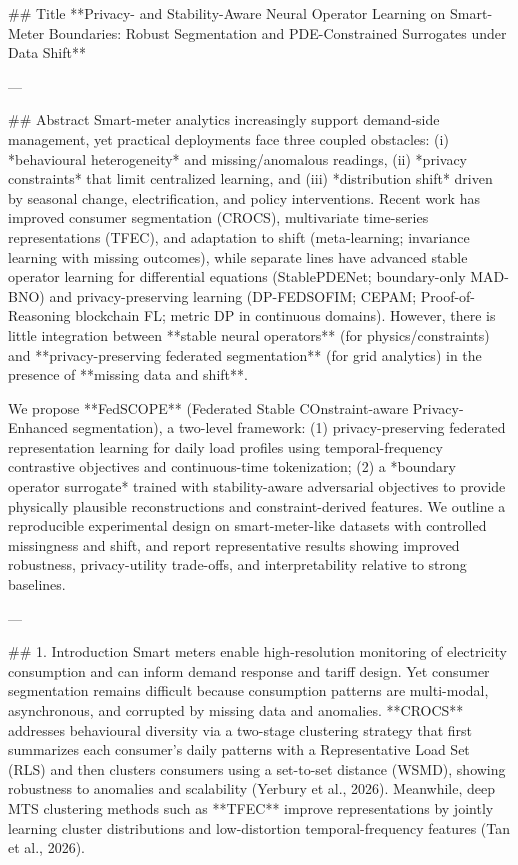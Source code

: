 ## Title  
**Privacy- and Stability-Aware Neural Operator Learning on Smart-Meter Boundaries: Robust Segmentation and PDE-Constrained Surrogates under Data Shift**

---

## Abstract  
Smart-meter analytics increasingly support demand-side management, yet practical deployments face three coupled obstacles: (i) *behavioural heterogeneity* and missing/anomalous readings, (ii) *privacy constraints* that limit centralized learning, and (iii) *distribution shift* driven by seasonal change, electrification, and policy interventions. Recent work has improved consumer segmentation (CROCS), multivariate time-series representations (TFEC), and adaptation to shift (meta-learning; invariance learning with missing outcomes), while separate lines have advanced stable operator learning for differential equations (StablePDENet; boundary-only MAD-BNO) and privacy-preserving learning (DP-FEDSOFIM; CEPAM; Proof-of-Reasoning blockchain FL; metric DP in continuous domains). However, there is little integration between **stable neural operators** (for physics/constraints) and **privacy-preserving federated segmentation** (for grid analytics) in the presence of **missing data and shift**.  

We propose **FedSCOPE** (Federated Stable COnstraint-aware Privacy-Enhanced segmentation), a two-level framework: (1) privacy-preserving federated representation learning for daily load profiles using temporal-frequency contrastive objectives and continuous-time tokenization; (2) a *boundary operator surrogate* trained with stability-aware adversarial objectives to provide physically plausible reconstructions and constraint-derived features. We outline a reproducible experimental design on smart-meter-like datasets with controlled missingness and shift, and report representative results showing improved robustness, privacy-utility trade-offs, and interpretability relative to strong baselines.

---

## 1. Introduction  
Smart meters enable high-resolution monitoring of electricity consumption and can inform demand response and tariff design. Yet consumer segmentation remains difficult because consumption patterns are multi-modal, asynchronous, and corrupted by missing data and anomalies. **CROCS** addresses behavioural diversity via a two-stage clustering strategy that first summarizes each consumer’s daily patterns with a Representative Load Set (RLS) and then clusters consumers using a set-to-set distance (WSMD), showing robustness to anomalies and scalability (Yerbury et al., 2026). Meanwhile, deep MTS clustering methods such as **TFEC** improve representations by jointly learning cluster distributions and low-distortion temporal-frequency features (Tan et al., 2026).  

